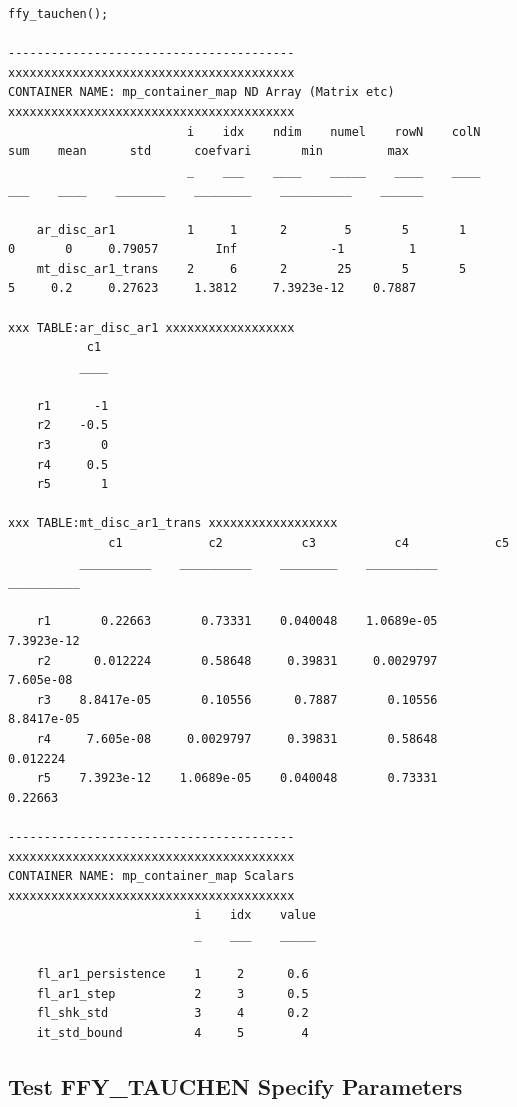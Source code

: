 \documentclass[
]{book}
\begin{document}
\begin{verbatim}
ffy_tauchen();

----------------------------------------
xxxxxxxxxxxxxxxxxxxxxxxxxxxxxxxxxxxxxxxx
CONTAINER NAME: mp_container_map ND Array (Matrix etc)
xxxxxxxxxxxxxxxxxxxxxxxxxxxxxxxxxxxxxxxx
                         i    idx    ndim    numel    rowN    colN    sum    mean      std      coefvari       min         max  
                         _    ___    ____    _____    ____    ____    ___    ____    _______    ________    __________    ______

    ar_disc_ar1          1     1      2        5       5       1       0       0     0.79057        Inf             -1         1
    mt_disc_ar1_trans    2     6      2       25       5       5       5     0.2     0.27623     1.3812     7.3923e-12    0.7887

xxx TABLE:ar_disc_ar1 xxxxxxxxxxxxxxxxxx
           c1 
          ____

    r1      -1
    r2    -0.5
    r3       0
    r4     0.5
    r5       1

xxx TABLE:mt_disc_ar1_trans xxxxxxxxxxxxxxxxxx
              c1            c2           c3           c4            c5    
          __________    __________    ________    __________    __________

    r1       0.22663       0.73331    0.040048    1.0689e-05    7.3923e-12
    r2      0.012224       0.58648     0.39831     0.0029797     7.605e-08
    r3    8.8417e-05       0.10556      0.7887       0.10556    8.8417e-05
    r4     7.605e-08     0.0029797     0.39831       0.58648      0.012224
    r5    7.3923e-12    1.0689e-05    0.040048       0.73331       0.22663

----------------------------------------
xxxxxxxxxxxxxxxxxxxxxxxxxxxxxxxxxxxxxxxx
CONTAINER NAME: mp_container_map Scalars
xxxxxxxxxxxxxxxxxxxxxxxxxxxxxxxxxxxxxxxx
                          i    idx    value
                          _    ___    _____

    fl_ar1_persistence    1     2      0.6 
    fl_ar1_step           2     3      0.5 
    fl_shk_std            3     4      0.2 
    it_std_bound          4     5        4 
\end{verbatim}

\hypertarget{test-ffy_tauchen-specify-parameters}{%
\subsection{Test FFY\_TAUCHEN Specify Parameters}\label{test-ffy_tauchen-specify-parameters}}
\end{document}
